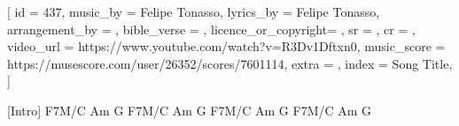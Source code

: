 [
    id                  = {437},
    music_by            = {Felipe Tonasso}, %
    lyrics_by           = {Felipe Tonasso}, %
    arrangement_by      = {}, %
    bible_verse         = {},
    licence_or_copyright= {},
    sr                  = {},
    cr                  = {},
    video_url           = {https://www.youtube.com/watch?v=R3Dv1Dftxn0},
    music_score         = {https://musescore.com/user/26352/scores/7601114},
    extra               = {},
    index               = {Song Title},
]

\beginverse

[Intro] F7M/C  Am  G
        F7M/C  Am  G
        F7M/C  Am  G
        F7M/C  Am  G

